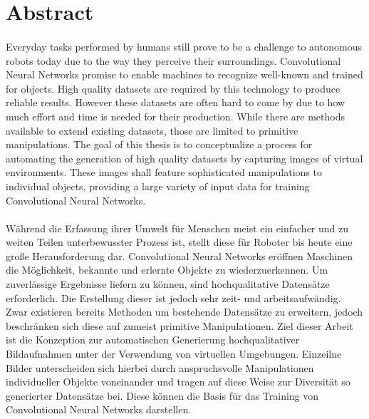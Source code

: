 \chapter*{Abstract}
\subsubsection*{\hsmatitelen}

Everyday tasks performed by humans still prove to be a challenge to autonomous robots today due to the way they perceive their surroundings. Convolutional Neural Networks promise to enable machines to recognize well-known and trained for objects. High quality datasets are required by this technology to produce reliable results. However these datasets are often hard to come by due to how much effort and time is needed for their production. While there are methods available to extend existing datasets, those are limited to primitive manipulations. The goal of this thesis is to conceptualize a process for automating the generation of high quality datasets by capturing images of virtual environments. These images shall feature sophisticated manipulations to individual objects, providing a large variety of input data for training Convolutional Neural Networks.

\subsubsection*{\hsmatitelde}
Während die Erfassung ihrer Umwelt für Menschen meist ein einfacher und zu weiten Teilen unterbewusster Prozess ist, stellt diese für Roboter bis heute eine große Herausforderung dar. Convolutional Neural Networks eröffnen Maschinen die Möglichkeit, bekannte und erlernte Objekte zu wiederzuerkennen. Um zuverlässige Ergebnisse liefern zu können, sind hochqualitative Datensätze erforderlich. Die Erstellung dieser ist jedoch sehr zeit- und arbeitsaufwändig. Zwar existieren bereits Methoden um bestehende Datensätze zu erweitern, jedoch beschränken sich diese auf zumeist primitive Manipulationen. Ziel dieser Arbeit ist die Konzeption zur automatischen Generierung hochqualitativer Bildaufnahmen unter der Verwendung von virtuellen Umgebungen. Einzeilne Bilder unterscheiden sich hierbei durch anspruchsvolle Manipulationen individueller Objekte voneinander und tragen auf diese Weise zur Diversität so generierter Datensätze bei. Diese können die Basis für das Training von Convolutional Neural Networks darstellen.